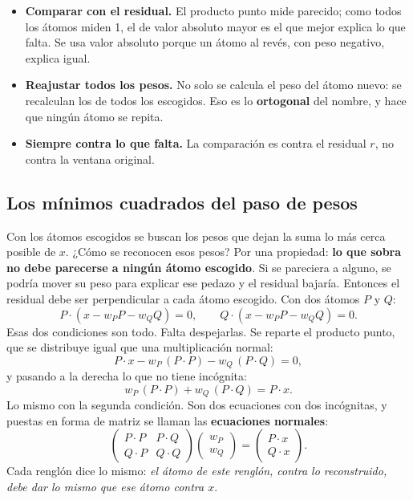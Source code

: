 \documentclass[11pt,letterpaper]{article}
\begin{document}
\begin{itemize}[itemsep=0.3em]
    \item \textbf{Comparar con el residual.} El producto punto mide
          parecido; como todos los átomos miden 1, el de valor absoluto
          mayor es el que mejor explica lo que falta. Se usa valor
          absoluto porque un átomo al revés, con peso negativo, explica
          igual.
    \item \textbf{Reajustar todos los pesos.} No solo se calcula el
          peso del átomo nuevo: se recalculan los de todos los
          escogidos. Eso es lo \textbf{ortogonal} del nombre, y hace
          que ningún átomo se repita.
    \item \textbf{Siempre contra lo que falta.} La comparación es
          contra el residual $r$, no contra la ventana original.
\end{itemize}

\subsection*{Los mínimos cuadrados del paso de pesos}

Con los átomos escogidos se buscan los pesos que dejan la suma lo más
cerca posible de $x$. ¿Cómo se reconocen esos pesos? Por una propiedad:
\textbf{lo que sobra no debe parecerse a ningún átomo escogido}. Si se
pareciera a alguno, se podría mover su peso para explicar ese pedazo y
el residual bajaría. Entonces el residual debe ser perpendicular a cada
átomo escogido. Con dos átomos $P$ y $Q$:
\[
    P \cdot (x - w_P P - w_Q Q) = 0, \qquad
    Q \cdot (x - w_P P - w_Q Q) = 0 .
\]
Esas dos condiciones son todo. Falta despejarlas. Se reparte el
producto punto, que se distribuye igual que una multiplicación normal:
\[
    P \cdot x - w_P\,(P \cdot P) - w_Q\,(P \cdot Q) = 0 ,
\]
y pasando a la derecha lo que no tiene incógnita:
\[
    w_P\,(P \cdot P) + w_Q\,(P \cdot Q) = P \cdot x .
\]
Lo mismo con la segunda condición. Son dos ecuaciones con dos
incógnitas, y puestas en forma de matriz se llaman las
\textbf{ecuaciones normales}:
\[
    \begin{pmatrix} P \cdot P & P \cdot Q \\ Q \cdot P & Q \cdot Q
    \end{pmatrix}
    \begin{pmatrix} w_P \\ w_Q \end{pmatrix}
    =
    \begin{pmatrix} P \cdot x \\ Q \cdot x \end{pmatrix} .
\]
Cada renglón dice lo mismo: \emph{el átomo de este renglón, contra lo
reconstruido, debe dar lo mismo que ese átomo contra $x$}.
\end{document}
